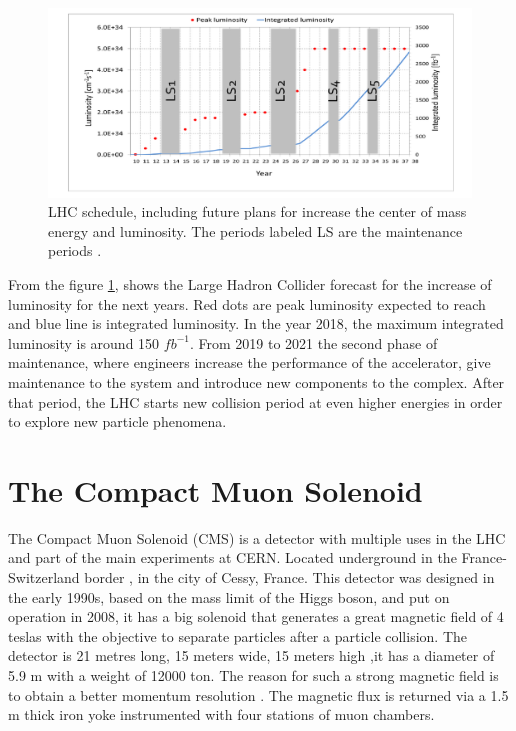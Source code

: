 \begin{figure}[!htbp]
\centering
\includegraphics[scale=0.5]{Chapter2/lum6.png}
\caption{LHC schedule, including future plans for increase the center of mass energy and luminosity. The periods labeled LS are the maintenance periods \cite{cern3}.}
\label{lhc-lumi}
\end{figure}
From the figure \ref{lhc-lumi}, shows the Large Hadron Collider forecast for the increase of luminosity for the next years. Red dots are peak luminosity expected to reach and blue line is integrated luminosity. In the year 2018, the maximum integrated luminosity is around 150 $fb^{-1}$\cite{cern3}. From 2019 to 2021 the second phase of maintenance, where engineers increase the performance of the accelerator, give maintenance to the system and introduce new components to the complex. After that period, the LHC starts new collision period at even higher energies in order to explore new particle phenomena.

\pagebreak

\section{The Compact Muon Solenoid}	
The Compact Muon Solenoid (CMS) is a detector with multiple uses in the LHC and part of the main experiments at CERN. Located underground in the France- Switzerland border , in the city of Cessy, France.
This detector was designed in the early 1990s, based on the mass limit of the Higgs boson,  and put on operation in 2008,  it has a big solenoid that generates a great magnetic field of 4 teslas with the objective to separate particles after a particle collision.
 The detector is 21 metres long, 15 meters wide, 15 meters high ,it has a diameter of 5.9 m with a weight of 12000 ton. The reason for such a strong magnetic field is to obtain a better momentum resolution .
 The magnetic flux is returned via a 1.5 m thick  iron yoke instrumented with four stations of muon
 chambers.



